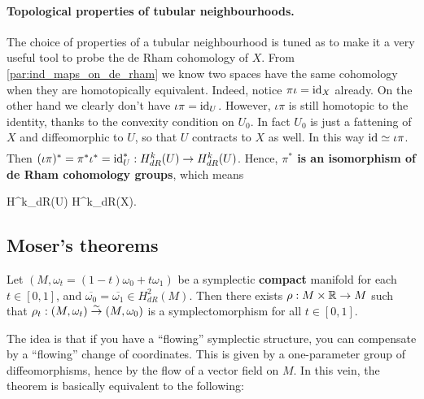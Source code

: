 \documentclass[main.tex]{subfiles}
\begin{document}
\paragraph{Topological properties of tubular neighbourhoods.} The choice of properties of a tubular neighbourhood is tuned as to make it a very useful tool to probe the de Rham cohomology of $X$. From \ref{par:ind_maps_on_de_rham} we know two spaces have the same cohomology when they are homotopically equivalent. Indeed, notice $\pi\iota = \mathrm{id}_X$ already. On the other hand we clearly don't have $\iota\pi = \mathrm{id}_U$. However, $\iota\pi$ is still homotopic to the identity, thanks to the convexity condition on $U_0$. In fact $U_0$ is just a fattening of $X$ and diffeomorphic to $U$, so that $U$ contracts to $X$ as well. In this way $\mathrm{id} \underset{}{\simeq} \iota\pi$. Then $(\iota\pi)^* = \pi^*\iota^* = \mathrm{id}_U^* : H^k_{dR}(U) \to H^k_{dR}(U)$. Hence, \textbf{$\pi^*$ is an isomorphism of de Rham cohomology groups}, which means
\begin{eqalign}
	H^k_{dR}(U) \iso H^k_{dR}(X).
\end{eqalign}

\subsection{Moser's theorems}
\begin{theorem}
\label{th:first_moser_th}
	Let $(M, \omega_t = (1-t)\omega_0+t\omega_1)$ be a symplectic \textbf{compact} manifold for each $t \in [0,1]$, and $\overline{\omega_0} = \overline{\omega_1} \in H^2_{dR}(M)$. Then there exists $\rho: M \times \mathbb{R} \to M$ such that $\rho_t : (M, \omega_t) \overset{\sim}\to (M,\omega_0)$ is a symplectomorphism for all $t \in [0,1]$.
\end{theorem}

The idea is that if you have a ``flowing'' symplectic structure, you can compensate by a ``flowing'' change of coordinates. This is given by a one-parameter group of diffeomorphisms, hence by the flow of a vector field on $M$. In this vein, the theorem is basically equivalent to the following:
\end{document}
